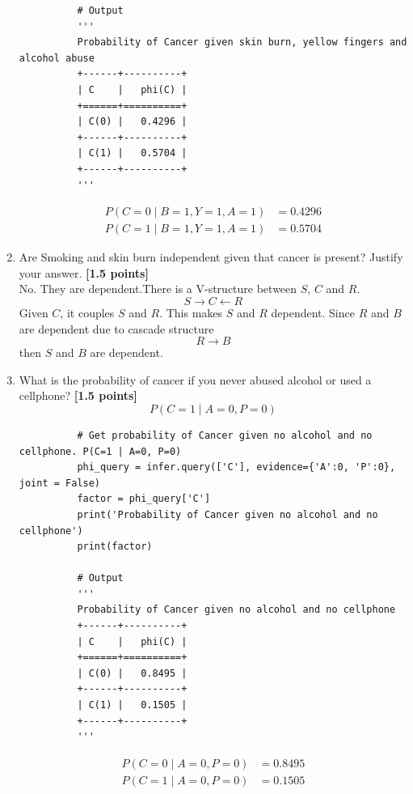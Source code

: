 \begin{enumerate}
\begin{lstlisting}
          # Output
          '''
          Probability of Cancer given skin burn, yellow fingers and alcohol abuse
          +------+----------+
          | C    |   phi(C) |
          +======+==========+
          | C(0) |   0.4296 |
          +------+----------+
          | C(1) |   0.5704 |
          +------+----------+
          '''
        \end{lstlisting}
        \begin{align*}
          P(C=0\mid B=1, Y=1, A=1) & =0.4296 \\
          P(C=1\mid B=1, Y=1, A=1) & =0.5704
        \end{align*}
  \item Are Smoking and skin burn independent given that cancer is present? Justify your answer. {\bf [1.5 points]}\\
        No. They are dependent.There is a V-structure between $S$, $C$ and $R$.
        $$S\rightarrow C\leftarrow R$$
        Given $C$, it couples $S$ and $R$. This makes $S$ and $R$ dependent. Since $R$ and $B$ are dependent due to cascade structure
        $$R \rightarrow B$$
        then $S$ and $B$ are dependent.
  \item What is the probability of cancer if you never abused alcohol or used a cellphone? {\bf [1.5 points]}
        $$P(C=1\mid A=0, P=0)$$
        \begin{lstlisting}
          # Get probability of Cancer given no alcohol and no cellphone. P(C=1 | A=0, P=0)
          phi_query = infer.query(['C'], evidence={'A':0, 'P':0}, joint = False)
          factor = phi_query['C']
          print('Probability of Cancer given no alcohol and no cellphone')
          print(factor)

          # Output
          '''
          Probability of Cancer given no alcohol and no cellphone
          +------+----------+
          | C    |   phi(C) |
          +======+==========+
          | C(0) |   0.8495 |
          +------+----------+
          | C(1) |   0.1505 |
          +------+----------+
          '''
        \end{lstlisting}
        \begin{align*}
          P(C=0\mid A=0, P=0) & =0.8495 \\
          P(C=1\mid A=0, P=0) & =0.1505
        \end{align*}
\end{enumerate}
